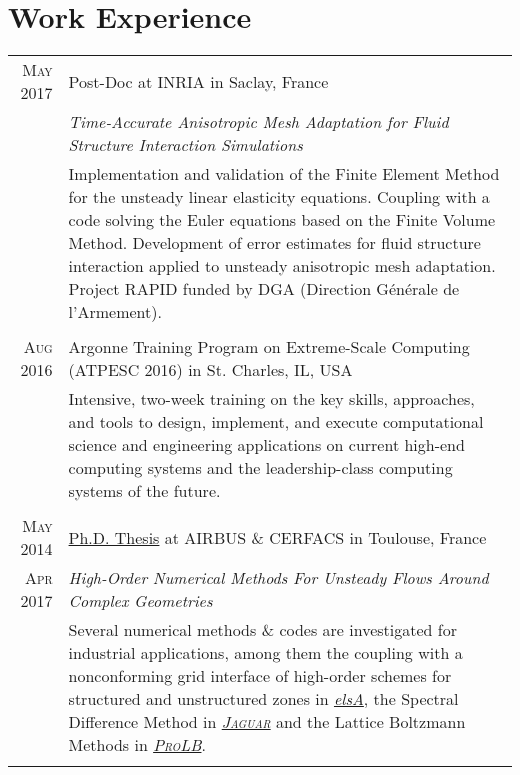 \documentclass[a4paper,10pt]{article}
\begin{document}
\section{Work Experience}
\begin{tabular}{r|p{15cm}}

\textsc{May 2017}   & Post-Doc at \textsc{INRIA} in Saclay, France \\
                    & \emph{Time-Accurate Anisotropic Mesh Adaptation for Fluid Structure Interaction Simulations} \\
                    & \footnotesize{Implementation and validation of the Finite Element Method for the unsteady linear elasticity equations.
                    Coupling with a code solving the Euler equations based on the Finite Volume Method. Development of error estimates
                    for fluid structure interaction applied to unsteady anisotropic mesh adaptation.
                    Project RAPID funded by DGA (Direction G\'en\'erale de l'Armement). } \\
                    \multicolumn{2}{c}{} \\

\textsc{Aug 2016}   & Argonne Training Program on Extreme-Scale Computing (ATPESC 2016) in St. Charles, IL, USA \\
                    & \footnotesize{Intensive, two-week training on the key skills, approaches, and tools 
                    to design, implement, and execute computational science and engineering applications 
                    on current high-end computing systems and the leadership-class computing systems of the future.} \\
                    \multicolumn{2}{c}{} \\

\textsc{May 2014}   & \href{http://pages.saclay.inria.fr/julien.vanharen/files/phd.pdf}{Ph.D. Thesis} at \textsc{AIRBUS} \& \textsc{CERFACS} in Toulouse, France \\
\textsc{Apr 2017}   & \emph{High-Order Numerical Methods For Unsteady Flows Around Complex Geometries} \\
                    & \footnotesize{Several numerical methods \& codes are investigated for industrial applications, among them the coupling with a 
                    nonconforming grid interface of high-order schemes for structured and unstructured 
                    zones in \href{http://elsa.onera.fr}{\emph{elsA}},
                    the Spectral Difference Method in \href{http://www.cerfacs.fr/~puigt/jaguar.html}{\emph{\textsc{Jaguar}}}
                    and the Lattice Boltzmann Methods in \href{http://www.prolb-cfd.com}{\emph{\textsc{ProLB}}}.} \\
                    \multicolumn{2}{c}{} \\


\end{tabular}
\end{document}
